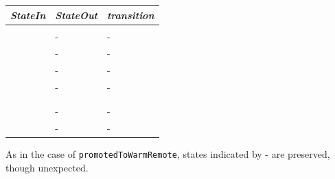 \begin{center}
  \footnotesize
  \begin{tabular}[h]{lll}
    \textit{StateIn}         & \textit{StateOut} & \textit{transition} \\\hline\\[2pt]
    \ReservedOutboundState{} & - & - \\[8pt]
    \UnnegotiatedStateAny{}  & - & - \\[8pt]
    \OutboundStateAny{}      & - & - \\[8pt]
    \InboundIdleStateAny{}   & - & - \\[8pt]
    \InboundStateAny{}       & \InboundIdleStateAny{} & \DemotedToColdAnyRem{} \\[8pt]
    \DuplexState{}           & \OutboundStateDupTau{} & \DemotedToColdDupRem{} \\[8pt]
    \TerminatingState{}      & - & - \\[8pt]
    \TerminatedState{}       & - & - \\[8pt]
  \end{tabular}
\end{center}
As in the case of \texttt{promotedToWarmRemote}, states indicated by - are
preserved, though unexpected.

